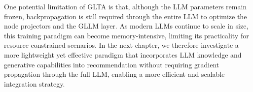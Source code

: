 One potential limitation of GLTA is that, although the LLM parameters remain frozen, backpropagation is still required through the entire LLM to optimize the node projectors and the GLLM layer. As modern LLMs continue to scale in size, this training paradigm can become memory-intensive, limiting its practicality for resource-constrained scenarios. In the next chapter, we therefore investigate a more lightweight yet effective paradigm that incorporates LLM knowledge and generative capabilities into recommendation without requiring gradient propagation through the full LLM, enabling a more efficient and scalable integration strategy.